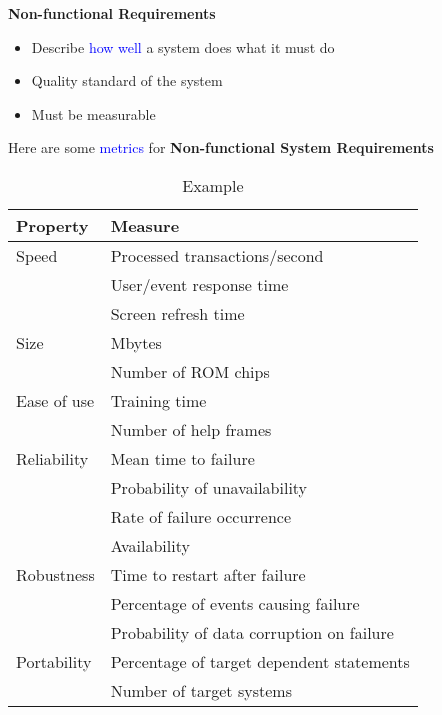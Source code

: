 \textbf{Non-functional Requirements}
\begin{itemize}
	\item Describe \textcolor{blue}{how well} a system does what it must do
	\item Quality standard of the system
	\item Must be measurable
\end{itemize}

Here are some \textcolor{blue}{metrics} for \textbf{Non-functional System Requirements}

\begin{table}[ht!]
    \centering
    \begin{tabular}{|l|l|}
        \hline
        \textbf{Property} & \textbf{Measure} \\
        \hline
        Speed & Processed transactions/second \\
             & User/event response time \\
             & Screen refresh time \\
        \hline
        Size & Mbytes \\
             & Number of ROM chips \\
        \hline
        Ease of use & Training time \\
                    & Number of help frames \\
        \hline
        Reliability & Mean time to failure \\
                    & Probability of unavailability \\
                    & Rate of failure occurrence \\
                    & Availability \\
        \hline
        Robustness & Time to restart after failure \\
                   & Percentage of events causing failure \\
                   & Probability of data corruption on failure \\
        \hline
        Portability & Percentage of target dependent statements \\
                    & Number of target systems \\
        \hline
    \end{tabular}
    \caption{Example}
    \label{tab:tab1}
\end{table}






